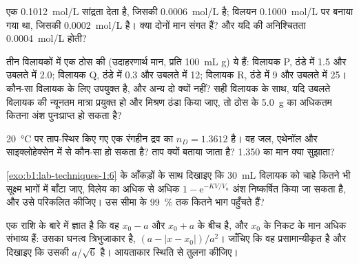 \begin{exercise}[$\star\star$]\label{exo:b1:lab-techniques-1:7}
एक  \qty{0.1012}{mol/L} सांद्रता देता है, जिसकी  \qty{0.0006}{mol/L} है; विलयन
\qty{0.1000}{mol/L} पर बनाया गया था, जिसकी  \qty{0.0002}{mol/L} है। क्या
दोनों मान संगत हैं? और यदि  की अनिश्चितता
\qty{0.0004}{mol/L} होती?
\end{exercise}

\begin{exercise}[$\star\star$]\label{exo:b1:lab-techniques-1:8}
तीन विलायकों में एक ठोस की  (उदाहरणार्थ मान, प्रति \qty{100}{mL} \unit{g}) ये हैं:
विलायक P, ठंडे में 1.5 और उबलते में 2.0; विलायक
Q, ठंडे में 0.3 और उबलते में 12; विलायक R, ठंडे में 9 और उबलते में 25। कौन-सा
विलायक  के लिए उपयुक्त है, और अन्य दो क्यों नहीं? सही
विलायक के साथ, यदि उबलते विलायक की न्यूनतम मात्रा प्रयुक्त हो और
मिश्रण ठंडा किया जाए, तो ठोस के \qty{5.0}{g} का अधिकतम कितना अंश पुनःप्राप्त हो सकता है?
\end{exercise}

\begin{exercise}[$\star\star$]\label{exo:b1:lab-techniques-1:9}
\qty{20}{\celsius} पर ताप-स्थिर किए गए एक रंगहीन द्रव का
$n_D = 1.3612$ है। वह जल, एथेनॉल और साइक्लोहेक्सेन में से कौन-सा हो सकता है? ताप
क्यों बताया जाता है? 1.350 का मान क्या सुझाता?
\end{exercise}

\begin{exercise}[$\star\star\star$]\label{exo:b1:lab-techniques-1:10}
\cref{exo:b1:lab-techniques-1:6} के आँकड़ों के साथ दिखाइए कि
\qty{30}{mL} विलायक को चाहे कितने भी सूक्ष्म भागों में बाँटा जाए, विलेय का अधिक से अधिक
$1 - \mathrm{e}^{-KV/V_a}$ अंश निष्कर्षित किया जा सकता है, और उसे परिकलित कीजिए।
उस सीमा के \qty{99}{\percent} तक कितने भाग पहुँचते हैं?
\end{exercise}

\begin{exercise}[$\star\star\star$]\label{exo:b1:lab-techniques-1:11}
एक राशि के बारे में ज्ञात है कि वह $x_0 - a$ और $x_0 + a$ के बीच है, और
$x_0$ के निकट के मान अधिक संभाव्य हैं: उसका घनत्व त्रिभुजाकार है, $(a - |x - x_0|)/a^2$।
जाँचिए कि वह प्रसामान्यीकृत है और दिखाइए कि उसकी 
$a/\sqrt6$ है। आयताकार स्थिति से तुलना कीजिए।
\end{exercise}


